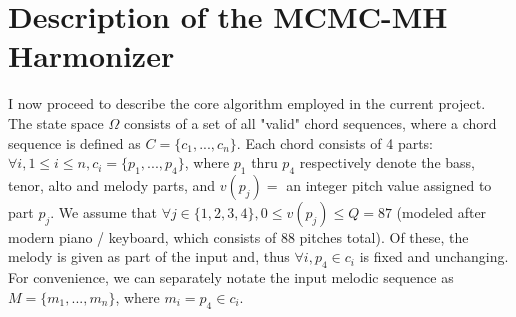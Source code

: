 \documentclass[twoside]{article}
\begin{document}
	\section{Description of the MCMC-MH Harmonizer}
	I now proceed to describe the core algorithm employed in the current project. The state space $\Omega$ consists of a set of all "valid" chord sequences, where a chord sequence is defined as $C = \{c_1,...,c_n\}$. Each chord consists of 4 parts: $\forall i, 1 \leq i \leq n, c_i=\{p_1, ..., p_4\}$, where $p_1$ thru $p_4$ respectively denote the bass, tenor, alto and melody parts, and $v(p_j) =$ an integer pitch value assigned to part $p_j$. We assume that $\forall j \in \{1,2,3,4\}, 0 \leq v(p_j) \leq Q = 87$ (modeled after modern piano / keyboard, which consists of 88 pitches total). Of these, the melody is given as part of the input and, thus $\forall i, p_4 \in c_i$ is fixed and unchanging. For convenience, we can separately notate  the input melodic sequence as $M=\{m_1,...,m_n\}$, where $m_i = p_4 \in c_i$.
\end{document}
